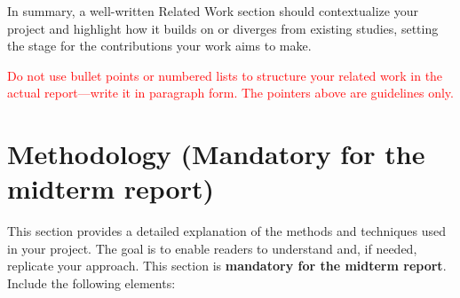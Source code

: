 \documentclass{article}
\begin{document}
In summary, a well-written Related Work section should contextualize your project and highlight how it builds on or diverges from existing studies, setting the stage for the contributions your work aims to make.

\textcolor{red}{Do not use bullet points or numbered lists to structure your related work in the actual report---write it in paragraph form. The pointers above are guidelines only.}

\section{Methodology (Mandatory for the midterm report)}

This section provides a detailed explanation of the methods and techniques used in your project. The goal is to enable readers to understand and, if needed, replicate your approach. This section is \textbf{mandatory for the midterm report}. Include the following elements:
\end{document}
